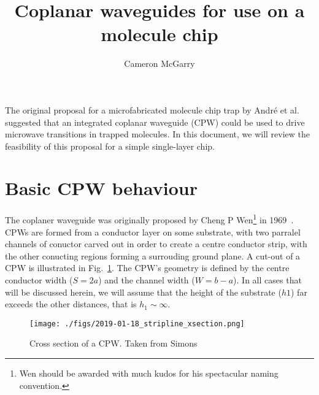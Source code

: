 \documentclass[a4paper]{article}
\title{Coplanar waveguides for use on a molecule chip}
\author{Cameron McGarry}
\begin{document}
\maketitle


The original proposal for a microfabricated molecule chip trap by Andr\'e et
al.~\cite{Andre2006} suggested that an integrated coplanar waveguide (CPW) could
be used to drive microwave transitions in trapped molecules. In this document,
we will review the feasibility of this proposal for a simple single-layer chip.

\section{Basic CPW behaviour}

The coplaner waveguide was originally proposed by Cheng P Wen\footnote{Wen
should be awarded with much kudos for his spectacular naming convention.} in
1969~\cite{1127105}. CPWs are formed from a conductor layer on some substrate,
with two parralel channels of conuctor carved out in order to create a centre
conductor strip, with the other conucting regions forming a surrouding ground
plane. A cut-out of a CPW is illustrated in Fig.~\ref{fig:CPWxsec}. The CPW's
geometry is defined by the centre conductor width ($S=2a$) and the channel width
($W=b-a$). In all cases that will be discussed herein, we will assume that the
height of the substrate ($h1$) far exceeds the other distances, that is $h_1
\sim \infty$.

\begin{figure}
  \texttt{[image: ./figs/2019-01-18\_stripline\_xsection.png]}
  \caption{Cross section of a CPW. Taken from Simons~\cite{Simons2004}}
  \label{fig:CPWxsec}
\end{figure}
\end{document}
